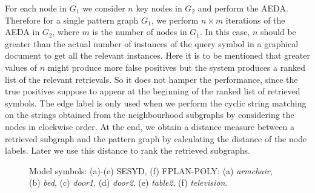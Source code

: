 For each node in $G_1$ we consider $n$ key nodes in $G_2$ and perform the AEDA. Therefore for a single pattern graph $G_1$, we perform $n \times m$ iterations of the AEDA in $G_2$, where $m$ is the number of nodes in $G_1$. In this case, $n$ should be greater than the actual number of instances of the query symbol in a graphical document to get all the relevant instances. Here it is to be mentioned that greater values of $n$ might produce more false positives but the system produces a ranked list of the relevant retrievals. So it does not hamper the performance, since the true positives suppose to appear at the beginning of the ranked list of retrieved symbols. The edge label is only used when we perform the cyclic string matching on the strings obtained from the neighbourhood subgraphs by considering the nodes in clockwise order. At the end, we obtain a distance measure between a retrieved subgraph and the pattern graph by calculating the distance of the node labels. Later we use this distance to rank the retrieved subgraphs.
\begin{figure}[!h]
\centering  
{}
\hspace{1mm}
\hspace{1mm}
\hspace{1mm}
\hspace{1mm}
\hspace{1mm}
\caption{Model symbols: (a)-(e) SESYD, (f) FPLAN-POLY: (a) \textit{armchair}, (b) \textit{bed}, (c) \textit{door1}, (d) \textit{door2}, (e) \textit{table2}, (f) \textit{television}.}
\label{fig:ncrag:symbim}
\end{figure}

